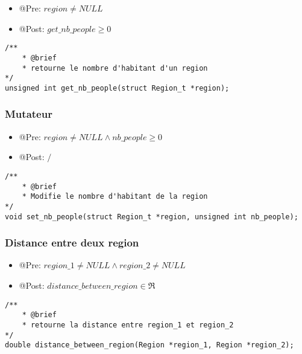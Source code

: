 \begin{itemize}
    \item @Pre: $region \ne NULL$
    \item @Post: $get\_nb\_people \ge 0$ 
\end{itemize}

\begin{lstlisting}
/**
    * @brief 
    * retourne le nombre d'habitant d'un region
*/
unsigned int get_nb_people(struct Region_t *region);
\end{lstlisting}

\subsubsection{Mutateur}

\begin{itemize}
    \item @Pre: $region \ne NULL \land nb\_people \ge 0$
    \item @Post: $\slash$
\end{itemize}

\begin{lstlisting}
/**
    * @brief 
    * Modifie le nombre d'habitant de la region
*/
void set_nb_people(struct Region_t *region, unsigned int nb_people);
\end{lstlisting} 


\subsubsection{Distance entre deux region}

\begin{itemize}
    \item @Pre: $region\_1 \ne NULL \land region\_2 \ne NULL$
    \item @Post: $distance\_between\_region \in \Re$ 
\end{itemize}

\begin{lstlisting}
/**
    * @brief 
    * retourne la distance entre region_1 et region_2
*/
double distance_between_region(Region *region_1, Region *region_2);
\end{lstlisting}


